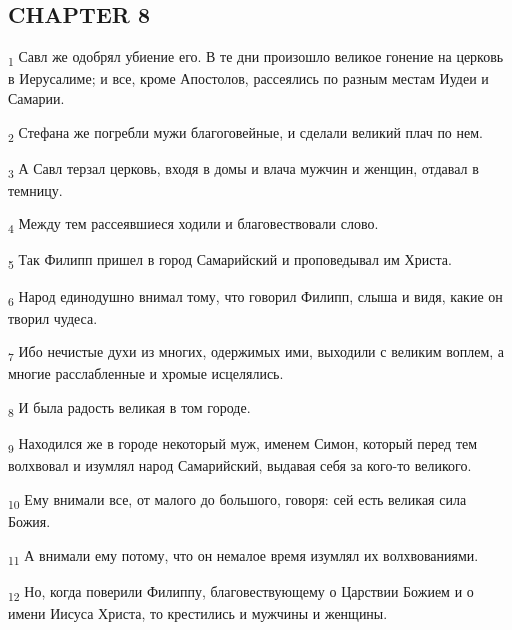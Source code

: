 \subsection{CHAPTER 8}
\begin{tcolorbox}
\textsubscript{1} Савл же одобрял убиение его. В те дни произошло великое гонение на церковь в Иерусалиме; и все, кроме Апостолов, рассеялись по разным местам Иудеи и Самарии.
\end{tcolorbox}
\begin{tcolorbox}
\textsubscript{2} Стефана же погребли мужи благоговейные, и сделали великий плач по нем.
\end{tcolorbox}
\begin{tcolorbox}
\textsubscript{3} А Савл терзал церковь, входя в домы и влача мужчин и женщин, отдавал в темницу.
\end{tcolorbox}
\begin{tcolorbox}
\textsubscript{4} Между тем рассеявшиеся ходили и благовествовали слово.
\end{tcolorbox}
\begin{tcolorbox}
\textsubscript{5} Так Филипп пришел в город Самарийский и проповедывал им Христа.
\end{tcolorbox}
\begin{tcolorbox}
\textsubscript{6} Народ единодушно внимал тому, что говорил Филипп, слыша и видя, какие он творил чудеса.
\end{tcolorbox}
\begin{tcolorbox}
\textsubscript{7} Ибо нечистые духи из многих, одержимых ими, выходили с великим воплем, а многие расслабленные и хромые исцелялись.
\end{tcolorbox}
\begin{tcolorbox}
\textsubscript{8} И была радость великая в том городе.
\end{tcolorbox}
\begin{tcolorbox}
\textsubscript{9} Находился же в городе некоторый муж, именем Симон, который перед тем волхвовал и изумлял народ Самарийский, выдавая себя за кого-то великого.
\end{tcolorbox}
\begin{tcolorbox}
\textsubscript{10} Ему внимали все, от малого до большого, говоря: сей есть великая сила Божия.
\end{tcolorbox}
\begin{tcolorbox}
\textsubscript{11} А внимали ему потому, что он немалое время изумлял их волхвованиями.
\end{tcolorbox}
\begin{tcolorbox}
\textsubscript{12} Но, когда поверили Филиппу, благовествующему о Царствии Божием и о имени Иисуса Христа, то крестились и мужчины и женщины.
\end{tcolorbox}
